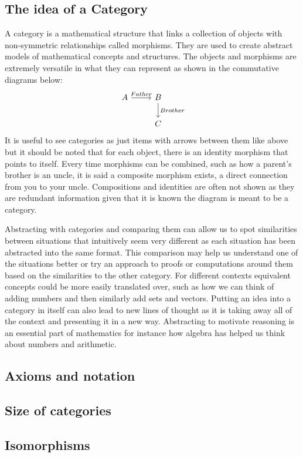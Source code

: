 \documentclass{article}
\begin{document}
\subsection{The idea of a Category}
A category is a mathematical structure that links a collection of objects with non-symmetric relationships called morphisms.
They are used to create abstract models of mathematical concepts and structures.
The objects and morphisms are extremely versatile in what they can represent as shown in the commutative diagrams below:
\begin{equation}
    \begin{tikzcd} 
        A \ar[r,"Father"]
            & B \ar[d,"Brother"] \\
            & C
    \end{tikzcd}
\end{equation}
It is useful to see categories as just items with arrows between them like
above but it should be noted that for each object, there is an identity
morphism that points to itself.  Every time morphisms can be combined, such
as how a parent's brother is an uncle, it is said a composite morphism
exists, a direct connection from you to your uncle.  Compositions and
identities are often not shown as they are redundant information given that
it is known the diagram is meant to be a category.

Abstracting with categories and comparing them can allow us to spot
similarities between situations that intuitively seem very different as
each situation has been abstracted into the same format.  This comparison
may help us understand one of the situations better or try an approach to
proofs or computations around them based on the similarities to the other
category.  For different contexts equivalent concepts could be more easily
translated over, such as how we can think of adding numbers and then
similarly add sets and vectors.  Putting an idea into a category in itself
can also lead to new lines of thought as it is taking away all of the
context and presenting it in a new way.  Abstracting to motivate reasoning
is an essential part of mathematics for instance how algebra has helped us
think about numbers and arithmetic.
\subsection{Axioms and notation}
\subsection{Size of categories}
\subsection{Isomorphisms}
\end{document}
